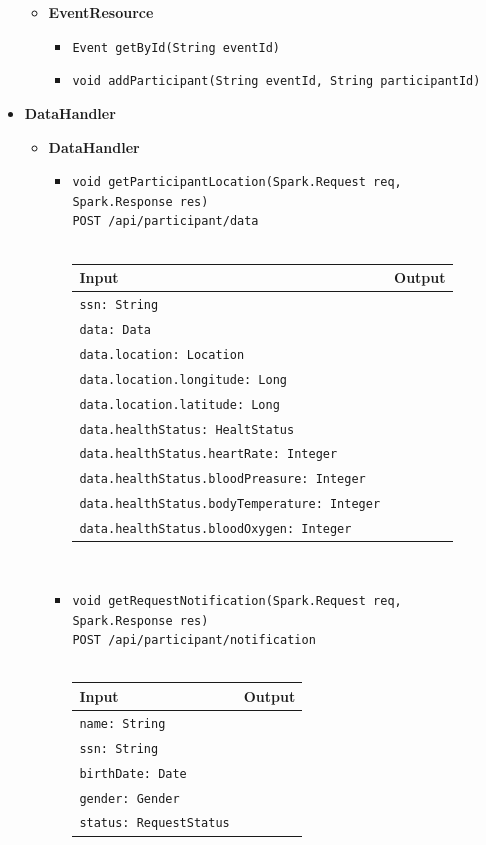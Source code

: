 \documentclass[a4paper, hidelinks, 12pt]{report}
\begin{document}
\begin{itemize}
\begin{itemize}
				\item{\textbf{EventResource}}
					\begin{itemize}
						\item{\verb|Event getById(String eventId)|}
						\item{\verb|void addParticipant(String eventId, String participantId)|}
					\end{itemize}
			\end{itemize}
			
		\item{\textbf{DataHandler}}
			\begin{itemize}
				\item{\textbf{DataHandler}}
					\begin{itemize}
						\item{\verb|void getParticipantLocation(Spark.Request req, Spark.Response res)|\\ \verb|POST /api/participant/data|}\\\\
			\begin{tabular}{l | l}
			\textbf{Input} & \textbf{Output} \\
			\hline
				\verb|ssn: String| & \\
				\verb|data: Data| & \\
				\verb|data.location: Location| & \\
				\verb|data.location.longitude: Long| & \\
				\verb|data.location.latitude: Long| & \\
				\verb|data.healthStatus: HealtStatus| & \\
				\verb|data.healthStatus.heartRate: Integer| & \\
				\verb|data.healthStatus.bloodPreasure: Integer| & \\
				\verb|data.healthStatus.bodyTemperature: Integer| & \\
				\verb|data.healthStatus.bloodOxygen: Integer| & \\
			\end{tabular}\\
			\item{\verb|void getRequestNotification(Spark.Request req, Spark.Response res)|\\ \verb|POST /api/participant/notification|}\\\\
			\begin{tabular}{l | l}
			\textbf{Input} & \textbf{Output} \\
			\hline
				\verb|name: String| & \\
				\verb|ssn: String| & \\
				\verb|birthDate: Date| & \\
				\verb|gender: Gender| & \\
				\verb|status: RequestStatus| & \\
			\end{tabular}\\
					\end{itemize}
		\end{itemize}
			

\end{itemize}
\end{document}
